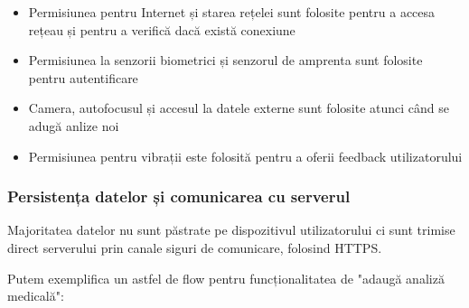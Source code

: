 \documentclass[12pt]{article}
\begin{document}
\begin{itemize}
    \item Permisiunea pentru Internet și starea rețelei sunt folosite
    pentru a accesa rețeau și pentru a verifică dacă există conexiune
    \item Permisiunea la senzorii biometrici și senzorul de amprenta sunt folosite
    pentru autentificare
    \item Camera, autofocusul și accesul la datele externe sunt folosite atunci când se adugă anlize noi
    \item Permisiunea pentru vibrații este folosită pentru a oferii feedback utilizatorului
\end{itemize}

\subsubsection{Persistența datelor și comunicarea cu serverul}

Majoritatea datelor nu sunt păstrate pe dispozitivul utilizatorului ci sunt
trimise direct serverului prin canale siguri de comunicare, folosind HTTPS.

Putem exemplifica un astfel de flow pentru funcționalitatea de "adaugă analiză medicală":
\end{document}
